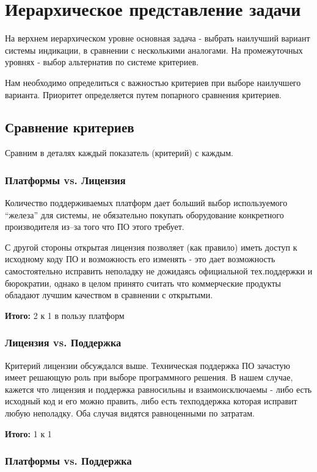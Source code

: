 \documentclass[a4paper,12pt]{report} %
\begin{document}
\section{Иерархическое представление задачи}

На верхнем иерархическом уровне основная задача - выбрать наилучший вариант
системы индикации, в сравнении с несколькими аналогами. На промежуточных уровнях
- выбор альтернатив по системе критериев.

Нам необходимо определиться с важностью критериев при выборе наилучшего
варианта. Приоритет определяется путем попарного сравнения критериев.

\subsection{Сравнение критериев}

Сравним в деталях каждый показатель (критерий) с каждым.
\subsubsection{Платформы vs. Лицензия}

Количество поддерживаемых платформ дает больший выбор используемого ``железа''
для системы, не обязательно покупать оборудование конкретного производителя
из--за того что ПО этого требует.

С другой стороны открытая лицензия позволяет (как правило) иметь доступ к
исходному коду ПО и возможность его изменять - это дает возможность
самостоятельно исправить неполадку не дожидаясь официальной тех.поддержки и
бюрократии, однако в целом принято считать что коммерческие продукты обладают
лучшим качеством в сравнении с открытыми.

\textbf{Итого:} 2 к 1 в пользу платформ
\subsubsection{Лицензия vs. Поддержка}

Критерий лицензии обсуждался выше. Техническая поддержка ПО зачастую имеет
решающую роль при выборе программного решения. В нашем случае, кажется что
лицензия и поддержка равносильны и взаимоисключаемы - либо есть исходный код и
его можно править, либо есть техподдержка которая исправит любую неполадку. Оба
случая видятся равноценными по затратам.

\textbf{Итого:} 1 к 1
\subsubsection{Платформы vs. Поддержка}
\end{document}
